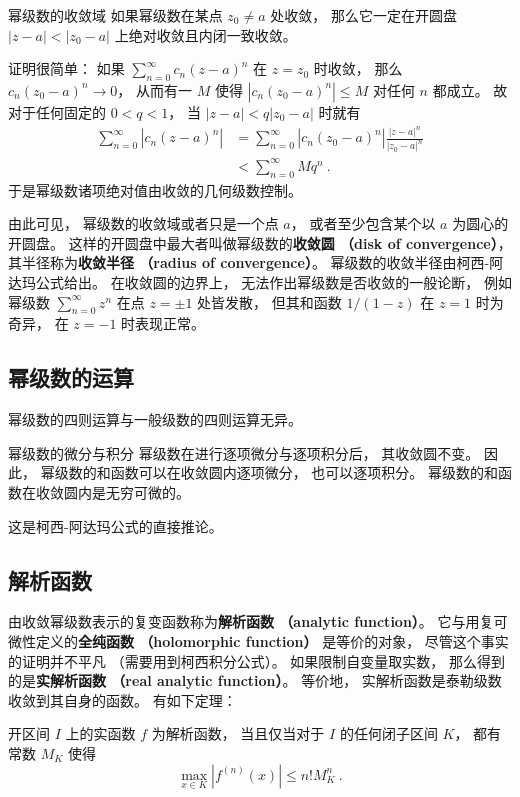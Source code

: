 \begin{theorem}{幂级数的收敛域}
如果幂级数在某点 $z_0\neq a$ 处收敛， 那么它一定在开圆盘 $|z-a|<|z_0-a|$ 上绝对收敛且内闭一致收敛。
\end{theorem}

证明很简单： 如果 $\sum_{n=0}^\infty c_n(z-a)^n$ 在 $z=z_0$ 时收敛， 那么 $c_n(z_0-a)^n\to0$， 从而有一 $M$ 使得 $|c_n(z_0-a)^n|\leq M$ 对任何 $n$ 都成立。 故对于任何固定的 $0<q<1$， 当 $|z-a|<q|z_0-a|$ 时就有
$$
\begin{aligned}
\sum_{n=0}^\infty |c_n(z-a)^n|
&=\sum_{n=0}^\infty |c_n(z_0-a)^n|\frac{|z-a|^n}{|z_0-a|^n}\\
&<\sum_{n=0}^\infty Mq^n~.
\end{aligned}
$$
于是幂级数诸项绝对值由收敛的几何级数控制。

由此可见， 幂级数的收敛域或者只是一个点 $a$， 或者至少包含某个以 $a$ 为圆心的开圆盘。 这样的开圆盘中最大者叫做幂级数的\textbf{收敛圆 （disk of convergence）}， 其半径称为\textbf{收敛半径 （radius of convergence）}。 幂级数的收敛半径由柯西-阿达玛公式给出。 在收敛圆的边界上， 无法作出幂级数是否收敛的一般论断， 例如幂级数 $\sum_{n=0}^\infty z^n$ 在点 $z=\pm1$ 处皆发散， 但其和函数 $1/(1-z)$ 在 $z=1$ 时为奇异， 在 $z=-1$ 时表现正常。

\subsection{幂级数的运算}
幂级数的四则运算与一般级数的四则运算无异。

\begin{theorem}{幂级数的微分与积分}
幂级数在进行逐项微分与逐项积分后， 其收敛圆不变。 因此， 幂级数的和函数可以在收敛圆内逐项微分， 也可以逐项积分。 幂级数的和函数在收敛圆内是无穷可微的。
\end{theorem}
这是柯西-阿达玛公式的直接推论。 

\subsection{解析函数}
由收敛幂级数表示的复变函数称为\textbf{解析函数 （analytic function）}。 它与用复可微性定义的\textbf{全纯函数 （holomorphic function）} 是等价的对象， 尽管这个事实的证明并不平凡 （需要用到柯西积分公式）。 如果限制自变量取实数， 那么得到的是\textbf{实解析函数 （real analytic function）}。 等价地， 实解析函数是泰勒级数收敛到其自身的函数。 有如下定理：

\begin{theorem}{}
开区间 $I$ 上的实函数 $f$ 为解析函数， 当且仅当对于 $I$ 的任何闭子区间 $K$， 都有常数 $M_K$ 使得
$$
\max_{x\in K}|f^{(n)}(x)|\leq n!M_K^n~.
$$
\end{theorem}

